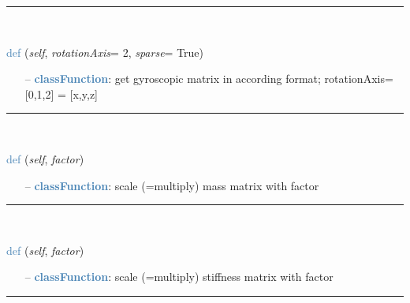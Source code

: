 \begin{itemize}[leftmargin=1.4cm]
\begin{itemize}[leftmargin=1.4cm]
\begin{itemize}[leftmargin=0.5cm]
\begin{itemize}[leftmargin=1.4cm]
\begin{itemize}[leftmargin=1.4cm]
\begin{itemize}[leftmargin=0.5cm]
%
\noindent\rule{8cm}{0.75pt}\vspace{1pt} \\ 
\begin{flushleft}
\noindent \textcolor{steelblue}{def {\bf {}}}\label{sec:FEM:FEMinterface:GetGyroscopicMatrix}
({\it self}, {\it rotationAxis}= 2, {\it sparse}= True)
\end{flushleft}
\setlength{\itemindent}{0.7cm}
\begin{itemize}[leftmargin=0.7cm]
\item[--]\textcolor{steelblue}{\bf classFunction}: get gyroscopic matrix in according format; rotationAxis=[0,1,2] = [x,y,z]
\vspace{12pt}\end{itemize}
%
\noindent\rule{8cm}{0.75pt}\vspace{1pt} \\ 
\begin{flushleft}
\noindent \textcolor{steelblue}{def {\bf {}}}\label{sec:FEM:FEMinterface:ScaleMassMatrix}
({\it self}, {\it factor})
\end{flushleft}
\setlength{\itemindent}{0.7cm}
\begin{itemize}[leftmargin=0.7cm]
\item[--]\textcolor{steelblue}{\bf classFunction}: scale (=multiply) mass matrix with factor
\vspace{12pt}\end{itemize}
%
\noindent\rule{8cm}{0.75pt}\vspace{1pt} \\ 
\begin{flushleft}
\noindent \textcolor{steelblue}{def {\bf {}}}\label{sec:FEM:FEMinterface:ScaleStiffnessMatrix}
({\it self}, {\it factor})
\end{flushleft}
\setlength{\itemindent}{0.7cm}
\begin{itemize}[leftmargin=0.7cm]
\item[--]\textcolor{steelblue}{\bf classFunction}: scale (=multiply) stiffness matrix with factor
\vspace{12pt}\end{itemize}
%
\noindent\rule{8cm}{0.75pt}\vspace{1pt} \\ 

\end{itemize}
\end{itemize}
\end{itemize}
\end{itemize}
\end{itemize}
\end{itemize}
